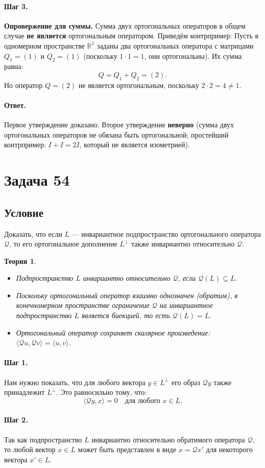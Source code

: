 \documentclass[12pt,a4paper]{article}
\theoremstyle{solution}
\newtheorem*{theory}{Теория}
\newcommand{\task}[1]{\newpage\section*{Задача #1}}
\newcommand{\answer}{\paragraph{Ответ.}}
\newcommand{\step}[1]{\paragraph{Шаг #1.}}
\newcommand{\R}{\mathbb{R}}
\begin{document}
\step{3} \textbf{Опровержение для суммы.} Сумма двух ортогональных операторов в общем случае \textbf{не является} ортогональным оператором. Приведём контрпример:
Пусть в одномерном пространстве $\R^1$ заданы два ортогональных оператора с матрицами $Q_1 = (1)$ и $Q_2 = (1)$ (поскольку $1\cdot1 = 1$, они ортогональны).
Их сумма равна:
\[
Q = Q_1 + Q_2 = (2).
\]
Но оператор $Q = (2)$ не является ортогональным, поскольку $2 \cdot 2 = 4 \neq 1$.

\answer
Первое утверждение доказано. Второе утверждение \textbf{неверно} (сумма двух ортогональных операторов не обязана быть ортогональной; простейший контрпример: $I + I = 2I$, который не является изометрией).

\task{54}
\subsection*{Условие}
Доказать, что если $L$ — инвариантное подпространство ортогонального оператора $\mathcal{Q}$, то его ортогональное дополнение $L^\perp$ также инвариантно относительно $\mathcal{Q}$.

\begin{theory}
\begin{itemize}
    \item Подпространство $L$ инвариантно относительно $\mathcal{Q}$, если $\mathcal{Q}(L) \subseteq L$.
    \item Поскольку ортогональный оператор взаимно однозначен (обратим), в конечномерном пространстве ограничение $\mathcal{Q}$ на инвариантное подпространство $L$ является биекцией, то есть $\mathcal{Q}(L) = L$.
    \item Ортогональный оператор сохраняет скалярное произведение: $\langle \mathcal{Q}u, \mathcal{Q}v\rangle = \langle u, v\rangle$.
\end{itemize}
\end{theory}

\step{1} Нам нужно показать, что для любого вектора $y \in L^\perp$ его образ $\mathcal{Q}y$ также принадлежит $L^\perp$. Это равносильно тому, что:
\[
\langle \mathcal{Q}y, x\rangle = 0 \quad \text{для любого } x \in L.
\]

\step{2} Так как подпространство $L$ инвариантно относительно обратимого оператора $\mathcal{Q}$, то любой вектор $x \in L$ может быть представлен в виде $x = \mathcal{Q}x'$ для некоторого вектора $x' \in L$.
\end{document}
